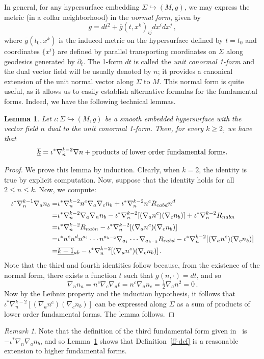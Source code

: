 \documentclass[a4paper,10.9pt]{amsart}
\newtheorem{lemma}[theorem]{Lemma}
\theoremstyle{definition}
\theoremstyle{remark}
\newtheorem{remark}[theorem]{Remark}
\numberwithin{equation}{section}
\renewcommand{\=}{\stackrel \Sigma =}
\renewcommand\geq{\geqslant}
\renewcommand\leq{\leqslant}
\newcommand{\FF}[1]{\underline{\overline{\rm{#1}}}}
\begin{document}
In general, for any hypersurface embedding $\Sigma \hookrightarrow (M,g)$, we may express the metric (in a collar neighborhood) in the \textit{normal form}, given by 
$$g = dt^2 + \bar{g}(t,x^k)_{ij} dx^i dx^j\,,$$
where $\bar{g}(t_0,x^k)$ is the induced metric on the hypersurface defined by $t = t_0$ and coordinates $\{x^i\}$ are defined by parallel transporting coordinates on $\Sigma$ along geodesics generated by $\partial_t$. 
The 1-form $dt$ is called the \textit{unit conormal 1-form} and the dual vector field will be usually denoted by $n$; 
it provides a canonical extension of 
the unit normal vector along $\Sigma$ to $M$.
This normal form is quite useful, as it allows us to easily establish alternative formulas for the fundamental forms. Indeed, we have the following technical lemmas.
\begin{lemma} \label{normal-derivs}
Let $\iota : \Sigma \hookrightarrow (M,g)$ be a smooth embedded hypersurface with the vector field $n$ dual to 
the unit conormal 1-form. Then, for every $k \geq 2$, we have that
$$\FF{k} = \iota^* \nabla_n^{k-2} \nabla n + \text{products of lower order fundamental forms.}$$
\end{lemma}
\begin{proof}
We prove this lemma by induction. Clearly, when $k = 2$, the identity is true by explicit computation. Now, suppose that the identity holds for all $2 \leq n \leq k$. Now, we compute:
\begin{align*}
\iota^* \nabla_{n}^{k-1} \nabla_a n_b =& \iota^*  \nabla_n^{k-2} n^c \nabla_a \nabla_c n_b + \iota^* \nabla_n^{k-2} n^c R_{cabd} n^d \\
=& \iota^*\nabla_n^{k-2} \nabla_a \nabla_n n_b - \iota^*\nabla_n^{k-2} [(\nabla_a n^c)(\nabla_c n_b)] + \iota^*\nabla_n^{k-2} R_{nabn} \\
=& \iota^*\nabla_n^{k-2} R_{nabn} - \iota^*\nabla_n^{k-2} [(\nabla_a n^c)(\nabla_c n_b)] \\
=& \iota^* n^c n^d n^{a_1} \cdots n^{a_{k-2}} \nabla_{a_1} \cdots \nabla_{a_{k-2}} R_{cabd} - \iota^*\nabla_n^{k-2} [(\nabla_a n^c)(\nabla_c n_b)] \\
=& \FF{k+1}{}_{ab} -  \iota^*\nabla_n^{k-2} [(\nabla_a n^c)(\nabla_c n_b)]\,.
\end{align*}
Note that the third and fourth identities follow because, from the existence of the normal form, there exists a function $t$ such that $g(n,\cdot) = dt$, and so
$$\nabla_n n_a = n^c \nabla_c \nabla_a t = n^c \nabla_a n_c = \tfrac{1}{2} \nabla_a n^2 = 0\,.$$
Now by the Leibniz property and the induction hypothesis, it follows that $\iota^*\nabla_n^{k-2} [(\nabla_a n^c)(\nabla_c n_b)]$ can be expressed along $\Sigma$ as a sum of products of lower order fundamental forms. The lemma follows.
\end{proof}
\begin{remark}
Note that the definition of the third fundamental form given in~\cite[Volume 3]{Spivak} is $-\iota^* \nabla_n \nabla_a n_b$, and so Lemma~\ref{normal-derivs} shows that Definition~\ref{ff-def} is a reasonable extension to higher fundamental forms.
\end{remark}
\end{document}
